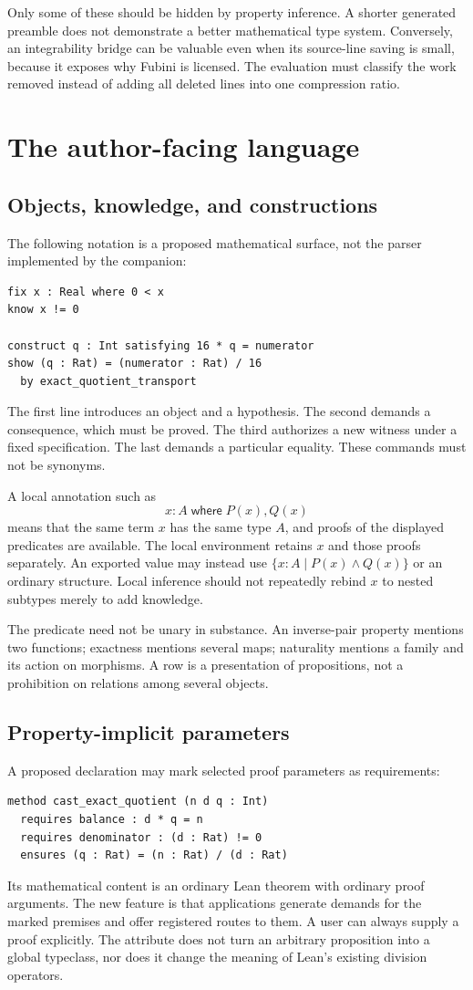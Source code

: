 \documentclass[11pt,a4paper]{article}
\theoremstyle{definition}\newtheorem{definition}[theorem]{Definition}
\theoremstyle{remark}\newtheorem{remark}[theorem]{Remark}
\begin{document}
Only some of these should be hidden by property inference. A shorter generated preamble does not demonstrate a better mathematical type system. Conversely, an integrability bridge can be valuable even when its source-line saving is small, because it exposes why Fubini is licensed. The evaluation must classify the work removed instead of adding all deleted lines into one compression ratio.

\section{The author-facing language}\label{sec:surface}

\subsection{Objects, knowledge, and constructions}
The following notation is a proposed mathematical surface, not the parser implemented by the companion:
\begin{lstlisting}
fix x : Real where 0 < x
know x != 0

construct q : Int satisfying 16 * q = numerator
show (q : Rat) = (numerator : Rat) / 16
  by exact_quotient_transport
\end{lstlisting}
The first line introduces an object and a hypothesis. The second demands a consequence, which must be proved. The third authorizes a new witness under a fixed specification. The last demands a particular equality. These commands must not be synonyms.

A local annotation such as
\[
 x:A\;\mathsf{where}\;P(x),Q(x)
\]
means that the same term $x$ has the same type $A$, and proofs of the displayed predicates are available. The local environment retains $x$ and those proofs separately. An exported value may instead use $\{x:A\mid P(x)\wedge Q(x)\}$ or an ordinary structure. Local inference should not repeatedly rebind $x$ to nested subtypes merely to add knowledge.

The predicate need not be unary in substance. An inverse-pair property mentions two functions; exactness mentions several maps; naturality mentions a family and its action on morphisms. A row is a presentation of propositions, not a prohibition on relations among several objects.

\subsection{Property-implicit parameters}
A proposed declaration may mark selected proof parameters as requirements:
\begin{lstlisting}
method cast_exact_quotient (n d q : Int)
  requires balance : d * q = n
  requires denominator : (d : Rat) != 0
  ensures (q : Rat) = (n : Rat) / (d : Rat)
\end{lstlisting}
Its mathematical content is an ordinary Lean theorem with ordinary proof arguments. The new feature is that applications generate demands for the marked premises and offer registered routes to them. A user can always supply a proof explicitly. The attribute does not turn an arbitrary proposition into a global typeclass, nor does it change the meaning of Lean's existing division operators.
\end{document}
